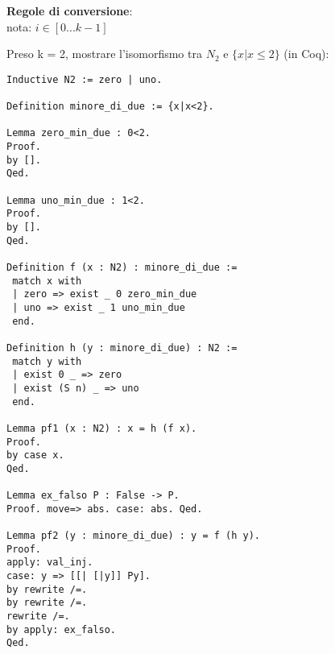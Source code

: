 \textbf{Regole di conversione}: \\

nota: $i \in [0 ... k-1]$

\begin{prooftree}
\end{prooftree}

Preso k = 2, mostrare l'isomorfismo tra $N_2$ e $\{x|x \leq 2\}$ (in Coq):

\begin{lstlisting}[language=Coq]
Inductive N2 := zero | uno.

Definition minore_di_due := {x|x<2}.

Lemma zero_min_due : 0<2.
Proof.
by [].
Qed.

Lemma uno_min_due : 1<2.
Proof.
by [].
Qed.

Definition f (x : N2) : minore_di_due :=
 match x with
 | zero => exist _ 0 zero_min_due
 | uno => exist _ 1 uno_min_due
 end.

Definition h (y : minore_di_due) : N2 :=
 match y with
 | exist 0 _ => zero
 | exist (S n) _ => uno
 end.

Lemma pf1 (x : N2) : x = h (f x).
Proof.
by case x.
Qed.

Lemma ex_falso P : False -> P.
Proof. move=> abs. case: abs. Qed.

Lemma pf2 (y : minore_di_due) : y = f (h y).
Proof.
apply: val_inj.
case: y => [[| [|y]] Py].
by rewrite /=.
by rewrite /=.
rewrite /=.
by apply: ex_falso.
Qed.
\end{lstlisting}